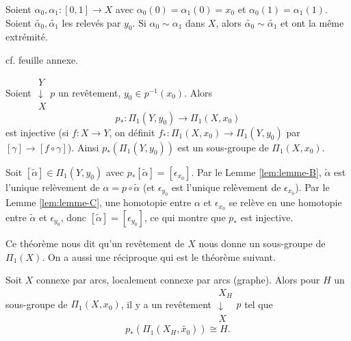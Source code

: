    \begin{lem}  \label{lem:lemme-C}
     Soient $\alpha_0, \alpha_1 : [0,1] \to X$ avec $\alpha_0 (0) = \alpha_1(0) = x_0$ et $\alpha_0(1) =
     \alpha_1(1)$. Soient $\tilde{\alpha_0}, \tilde{\alpha_1}$ les relevés par $y_0$. Si $\alpha_0 \sim
     \alpha_1$ dans $X$, alors $\tilde{\alpha_0} \sim \tilde{\alpha_1}$ et ont la même extrémité.
   \end{lem}

   \begin{preuve}
     cf. feuille annexe.
   \end{preuve}

   
   \begin{theo} \label{thm:thm-1}
     Soient $\substack{Y\\\downarrow\\ X}p$ un revêtement, $y_0 \in p^{-1}(x_0)$. Alors 
       \[p_\ast : \Pi_1(Y, y_0) \to \Pi_1(X, x_0)\]
     est injective (si $f: X \to Y$, on définit $f_\ast: \Pi_1(X, x_0) \to \Pi_1(Y, y_0)$ par $[\gamma] \to [f
     \circ \gamma]$). Ainsi $p_\ast(\Pi_1(Y, y_0))$ est un sous-groupe de $\Pi_1(X, x_0)$.
   \end{theo}

   \begin{preuve}
     Soit $[\tilde{\alpha}] \in \Pi_1(Y, y_0)$ avec $p_\ast[\tilde{\alpha}] = [\epsilon_{x_0}]$. Par le Lemme
     \ref{lem:lemme-B}, $\tilde{\alpha}$ est l'unique relèvement de $\alpha = p \circ \tilde{\alpha}$ (et
     $\epsilon_{y_0}$ est l'unique relèvement de $\epsilon_{x_0}$). Par le Lemme \ref{lem:lemme-C}, une
     homotopie entre $\alpha$ et $\epsilon_{x_0}$ se relève en une homotopie entre $\tilde{\alpha}$ et
     $\epsilon_{y_0}$, donc $[\tilde{\alpha}] = [\epsilon_{y_0}]$, ce qui montre que $p_\ast$ est injective.
   \end{preuve}

   Ce théorème nous dit qu'un revêtement de $X$ nous donne un sous-groupe de $\Pi_1(X)$. On a aussi une
   réciproque qui est le théorème suivant.

   \begin{theo} \label{thm:thm-2}
     Soit $X$ connexe par arcs, localement connexe par arcs (graphe). Alors pour $H$ un sous-groupe de
     $\Pi_1(X, x_0)$, il y a un revêtement $\substack{X_H\\\downarrow\\ X}p$ tel que 
       \[p_\ast(\Pi_1(X_H, \tilde{x_0})) \cong H.\]
   \end{theo}
   
